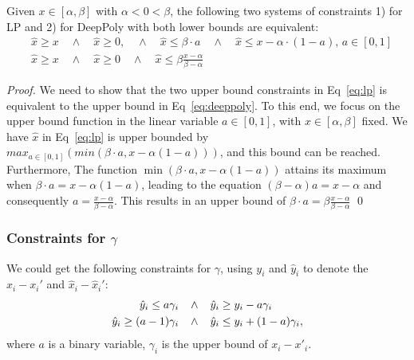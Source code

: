\begin{proposition}
	\label{LP}
	Given $x \in [\alpha,\beta]$ with $\alpha < 0 < \beta$, the following two systems of constraints 
	1) for LP and 2) for DeepPoly with both lower bounds are equivalent:
	\begin{align}
& \hat{x} \geq x \quad \wedge \quad \hat{x} \geq 0, \quad \wedge \quad \hat{x} \leq \beta \cdot a \quad \wedge \quad \hat{x} \leq x-\alpha \cdot (1-a), \, a \in [0,1]  \label{eq:lp}\\
&\hat{x} \geq x \quad \wedge \quad \hat{x} \geq 0 \quad \wedge \quad \hat{x} \leq \beta \frac{x-\alpha}{\beta-\alpha} \label{eq:deeppoly}
	\end{align} 
\end{proposition}

\begin{proof}
We need to show that the two upper bound constraints in Eq~\ref{eq:lp} is equivalent to the upper bound in Eq~\ref{eq:deeppoly}. To this end, we focus on the upper bound function in the linear variable $a \in  [0,1]$, with $x \in [\alpha,\beta]$ fixed. We have $\hat{x}$ in Eq~\ref{eq:lp} is upper bounded by $max_{a \in [0,1]} (min(\beta \cdot a, x - \alpha (1-a)))$, and this bound can be reached. Furthermore, 
	The function $\min(\beta \cdot a, x - \alpha (1-a))$ attains its maximum when $\beta \cdot a = x - \alpha (1-a)$, leading to the equation $(\beta - \alpha) a = x - \alpha$ and consequently $a = \frac{x - \alpha}{\beta-\alpha}$. This results in an upper bound of $\beta \cdot a = \beta \frac{x - \alpha}{\beta-\alpha}$ \qed
\end{proof}

\subsubsection*{Constraints for $\gamma$}

We could get the following constraints for $\gamma$, using $y_i$ and $\hat{y}_i$ to denote the $x_i-x_i'$ and $\hat{x}_i-\hat{x}_i'$:\begin{align*}
	\hat{y}_i \leq a \gamma_i \hspace*{2ex} &\wedge \hspace*{2ex}\hat{y}_i \geq y_i - a \gamma_i\\
	\hat{y}_i \geq (a-1) \gamma_i  \hspace*{2ex} &\wedge \hspace*{2ex} \hat{y}_i \leq y_i + (1-a) \gamma_i,
\end{align*} where $a$ is a binary variable, $\gamma_i$ is the upper bound of $x_i-x'_i$.


